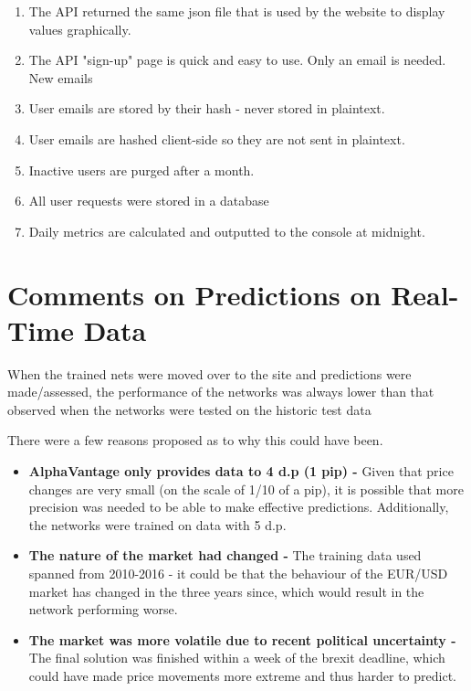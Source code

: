     \begin{enumerate}
        \item The API returned the same json file that is used by the website to display values graphically.
        
        \item The API "sign-up" page is quick and easy to use. Only an email is needed. New emails 
        
        \item User emails are stored by their hash - never stored in plaintext.

        \item User emails are hashed client-side so they are not sent in plaintext.
        
        \item Inactive users are purged after a month.
        
        \item All user requests were stored in a database
        
        \item Daily metrics are calculated and outputted to the console at midnight.
    
    \end{enumerate}

    \section{Comments on Predictions on Real-Time Data}
    When the trained nets were moved over to the site and predictions were made/assessed, the performance of the networks was always lower than that observed when the networks were tested on the historic test data

    There were a few reasons proposed as to why this could have been.
    \begin{itemize}
        \item \textbf{AlphaVantage only provides data to 4 d.p (1 pip) - } Given that price changes are very small (on the scale of 1/10 of a pip), it is possible that more precision was needed to be able to make effective predictions. Additionally, the networks were trained on data with 5 d.p.
        \item \textbf{The nature of the market had changed - } The training data used spanned from 2010-2016 - it could be that the behaviour of the EUR/USD market has changed in the three years since, which would result in the network performing worse.
        \item \textbf{The market was more volatile due to recent political uncertainty - } The final solution was finished within a week of the brexit deadline, which could have made price movements more extreme and thus harder to predict.
    \end{itemize}

